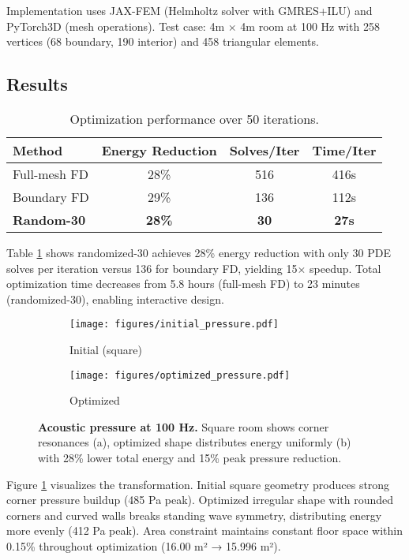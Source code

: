 \documentclass{article}
\begin{document}
Implementation uses JAX-FEM \cite{xue2023jaxfem} (Helmholtz solver with GMRES+ILU) and PyTorch3D (mesh operations). Test case: 4m $\times$ 4m room at 100 Hz with 258 vertices (68 boundary, 190 interior) and 458 triangular elements.

\subsection{Results}

\begin{table}[t]
\centering
\caption{Optimization performance over 50 iterations.}
\label{tab:results}
\small
\begin{tabular}{lccc}
\toprule
\textbf{Method} & \textbf{Energy Reduction} & \textbf{Solves/Iter} & \textbf{Time/Iter} \\
\midrule
Full-mesh FD & 28\% & 516 & 416s \\
Boundary FD  & 29\% & 136 & 112s \\
\textbf{Random-30} & \textbf{28\%} & \textbf{30} & \textbf{27s} \\
\bottomrule
\end{tabular}
\end{table}

Table \ref{tab:results} shows randomized-30 achieves 28\% energy reduction with only 30 PDE solves per iteration versus 136 for boundary FD, yielding 15$\times$ speedup. Total optimization time decreases from 5.8 hours (full-mesh FD) to 23 minutes (randomized-30), enabling interactive design.

\begin{figure}[t]
\centering
\begin{subfigure}{0.48\columnwidth}
    \texttt{[image: figures/initial\_pressure.pdf]}
    \caption{Initial (square)}
\end{subfigure}
\hfill
\begin{subfigure}{0.48\columnwidth}
    \texttt{[image: figures/optimized\_pressure.pdf]}
    \caption{Optimized}
\end{subfigure}
\caption{\textbf{Acoustic pressure at 100 Hz.} Square room shows corner resonances (a), optimized shape distributes energy uniformly (b) with 28\% lower total energy and 15\% peak pressure reduction.}
\label{fig:pressure}
\end{figure}

Figure \ref{fig:pressure} visualizes the transformation. Initial square geometry produces strong corner pressure buildup (485 Pa peak). Optimized irregular shape with rounded corners and curved walls breaks standing wave symmetry, distributing energy more evenly (412 Pa peak). Area constraint maintains constant floor space within 0.15\% throughout optimization (16.00 m² → 15.996 m²).
\end{document}
